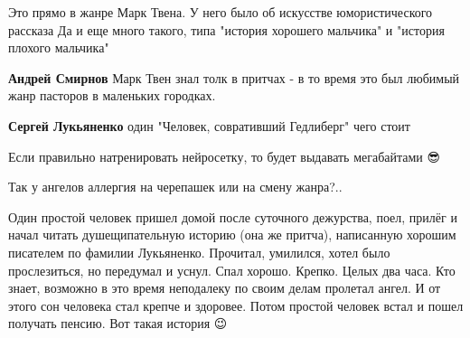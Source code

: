 \begin{itemize}
Это прямо в жанре Марк Твена. У него было об искусстве юмористического рассказа
\Smiley[1.0][yellow] Да и еще много такого, типа "история хорошего мальчика" и "история плохого
мальчика"

\begin{itemize}
 
\textbf{Андрей Смирнов} Марк Твен знал толк в притчах - в то время это был любимый жанр пасторов в маленьких городках.

 
\textbf{Сергей Лукьяненко} один "Человек, совративший Гедлиберг" чего стоит \Smiley[1.0][yellow]
\end{itemize}

 
Если правильно натренировать нейросетку, то будет выдавать мегабайтами 😎

 
Так у ангелов аллергия на черепашек или на смену жанра?..
\Smiley[1.0][yellow]

 

Один простой человек пришел домой после суточного дежурства, поел, прилёг и
начал читать душещипательную историю (она же притча), написанную хорошим
писателем по фамилии Лукьяненко. Прочитал, умилился, хотел было прослезиться,
но передумал и уснул. Спал хорошо. Крепко. Целых два часа. Кто знает, возможно
в это время неподалеку по своим делам пролетал ангел. И от этого сон человека
стал крепче и здоровее. Потом простой человек встал и пошел получать пенсию.
Вот такая история 😉


\end{itemize}
